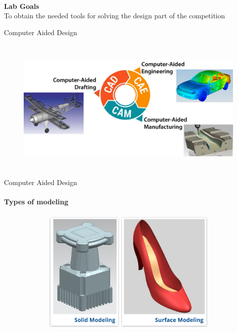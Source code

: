 \documentclass[aspectratio=169]{beamer}
\begin{document}
\begin{frame}[c]{}
    \framesubtitle{}
    \centering \LARGE \textbf{Lab Goals} \\
    To obtain the needed tools for solving the design part of the competition
\end{frame}

\begin{frame}[t]{Computer Aided Design}
    \framesubtitle{}
        \vspace{-0.6cm}
        \begin{figure}[H]
            \centering\includegraphics[height=6.5cm,width=1\textwidth,keepaspectratio]{resources/CADCAMCAE.png}
            \label{fig:resources/CADCAMCAE.png}
        \end{figure}
    \end{frame}
    
    \begin{frame}[t]{Computer Aided Design}
    \framesubtitle{Types of modeling}
        \vspace{-0.6cm}
        \begin{figure}[H]
            \centering\includegraphics[height=6cm,width=1\textwidth,keepaspectratio]{resources/solidsurface.png}
            \label{fig:resources/solidsurface.png}
        \end{figure}
    \end{frame}
    
\end{document}

